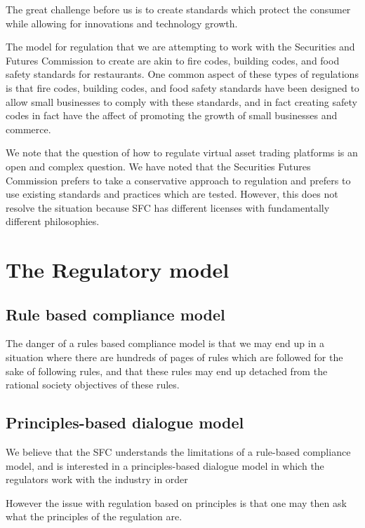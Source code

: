 The great challenge before us is to create standards which protect the
consumer while allowing for innovations and technology growth.

The model for regulation that we are attempting to work with the
Securities and Futures Commission to create are akin to fire codes,
building codes, and food safety standards for restaurants.  One common
aspect of these types of regulations is that fire codes, building
codes, and food safety standards have been designed to allow small
businesses to comply with these standards, and in fact creating safety
codes in fact have the affect of promoting the growth of small
businesses and commerce.



We note that the question of how to regulate virtual asset trading
platforms is an open and complex question.  We have noted that the
Securities Futures Commission prefers to take a conservative approach
to regulation and prefers to use existing standards and practices
which are tested.  However, this does not resolve the situation
because SFC has different licenses with fundamentally different
philosophies.

\section{The Regulatory model}

\subsection{Rule based compliance model}

The danger of a rules based compliance model is that we may end up in
a situation where there are hundreds of pages of rules which are
followed for the sake of following rules, and that these rules may end
up detached from the rational society objectives of these rules.  

\subsection{Principles-based dialogue model}

We believe that the SFC understands the limitations of a rule-based
compliance model, and is interested in a principles-based dialogue
model in which the regulators work with the industry in order

However the issue with regulation based on principles is that one may
then ask what the principles of the regulation are.


